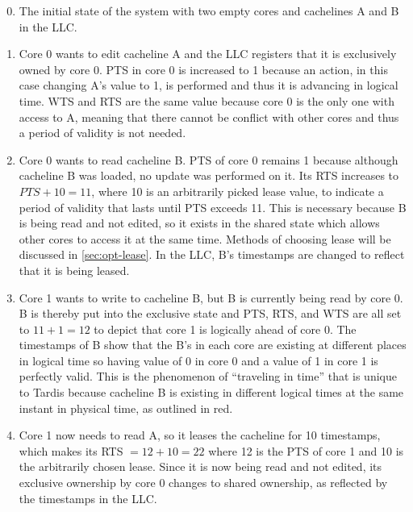 \documentclass[12pt]{article}
\begin{document}
\begin{enumerate}
\setcounter{enumi}{-1}
	
\item The initial state of the system with two empty cores and cachelines A and B in the LLC.

\item Core 0 wants to edit cacheline A and the LLC registers that it is 
exclusively owned by core 0. PTS in core 0 is increased to 1 because 
an action, in this case changing A's value to 1, is performed and thus 
it is advancing in logical time. WTS and RTS are the same value because core 0 is the only one with access to A, meaning that there cannot be conflict with other cores and thus a period of validity is not needed.

\item Core 0 wants to read cacheline B. PTS of core 0 remains 1 because 
although cacheline B was loaded, no update was performed on it. Its RTS increases to $PTS + 10 = 11$, where 10 is an 
arbitrarily picked lease value, to indicate a period of validity that 
lasts until PTS exceeds 11. This is necessary because B is being read and not edited, so it exists in the shared state which allows other cores to access it at the same time. Methods of choosing lease will be 
discussed in \cref{sec:opt-lease}. In the LLC, B's timestamps are  
changed to reflect that it is being leased.

\item Core 1 wants to write to cacheline B, but B is currently being read by core 
0. B is thereby put into the exclusive state and PTS, RTS, and WTS are all 
set to $11 + 1 = 12$ to depict that core 1 is logically ahead of core 0.  
The timestamps of B show that the B's in each core are existing at different 
places in logical time so having value of 0 in core 0 and 
a value of 1 in core 1 is perfectly valid. This is the phenomenon of 
``traveling in time'' that is unique to Tardis because cacheline B is 
existing in different logical times at the same instant in physical 
time, as outlined in red.

\item Core 1 now needs to read A, so it leases the cacheline for 10 
timestamps, which makes its RTS $= 12 + 10 = 22$ where 12 is the PTS of 
core 1 and 10 is the arbitrarily chosen lease. Since it is now being 
read and not edited, its exclusive ownership by core 0 changes to 
shared ownership, as reflected by the timestamps in the LLC.
\end{enumerate}
\end{document}
